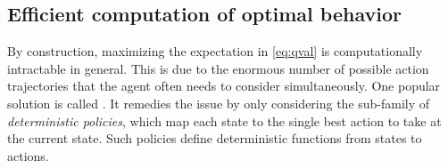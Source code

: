 \documentclass[10pt,letterpaper]{article}
\begin{document}
\subsection{Efficient computation of optimal behavior}
By construction, maximizing the expectation in  \eqref{eq:qval} is computationally intractable in general.
This is due to the enormous number of possible action
trajectories that the agent often needs to
consider simultaneously.
One popular solution is called . It remedies
the issue by only considering the sub-family of
\textit{deterministic policies}, which map each state to the single best action to
take at the current state. Such policies define deterministic functions from states to actions.
\end{document}
